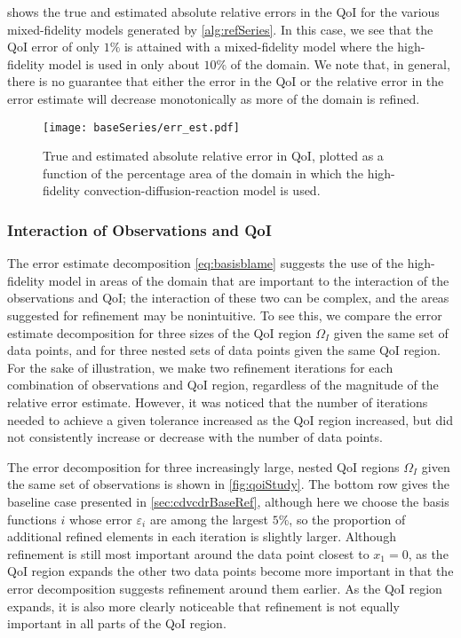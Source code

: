  shows the true and estimated absolute relative errors in the QoI for the various mixed-fidelity models generated by \cref{alg:refSeries}. In this case, we see that the QoI error of only $1\%$ is attained with a mixed-fidelity model where the high-fidelity model is used in only about $10\%$ of the domain. We note that, in general, there is no guarantee that either the error in the QoI or the relative error in the error estimate will decrease monotonically as more of the domain is refined.
%
\begin{figure}[htbp]
\centering
\texttt{[image: baseSeries/err\_est.pdf]}
\caption{True and estimated absolute relative error in QoI, plotted as a function of the percentage area of the domain in which the high-fidelity convection-diffusion-reaction model is used. }
\label{fig:baseErr}
\end{figure}
%

\subsubsection{Interaction of Observations and QoI} \label{sec:qoivdata}
%
The error estimate decomposition \cref{eq:basisblame} suggests the use of the high-fidelity model in areas of the domain that are important to the interaction of the observations and QoI; the interaction of these two can be complex, and the areas suggested for refinement may be nonintuitive. To see this, we compare the error estimate decomposition for three sizes of the QoI region $\Omega_I$ given the same set of data points, and for three nested sets of data points given the same QoI region. For the sake of illustration, we make two refinement iterations for each combination of observations and QoI region, regardless of the magnitude of the relative error estimate. However, it was noticed that the number of iterations needed to achieve a given tolerance increased as the QoI region increased, but did not consistently increase or decrease with the number of data points.

The error decomposition for three increasingly large, nested QoI regions $\Omega_I$ given the same set of observations is shown in \cref{fig:qoiStudy}. The bottom row gives the baseline case presented in \cref{sec:cdvcdrBaseRef}, although here we choose the basis functions $i$ whose error $\varepsilon_i$ are among the largest $5\%$, so the proportion of additional refined elements in each iteration is slightly larger. Although refinement is still most important around the data point closest to $x_1=0$, as the QoI region expands the other two data points become more important in that the error decomposition suggests refinement around them earlier. As the QoI region expands, it is also more clearly noticeable that refinement is not equally important in all parts of the QoI region.

